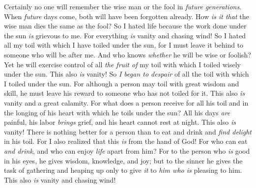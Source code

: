\begin{biblechapter}
\verse Certainly no one will remember the wise man or the fool in \textit{future generations}. When \textit{future} days come, both will have been forgotten already. How \textit{is it that} the wise man dies the same as the fool?
\verse So I hated life because the work done under the sun \textit{is} grievous to me. For everything \textit{is} vanity and chasing wind!
\verse So I hated all my toil with which I have toiled under the sun, for I must leave it behind to someone who will be after me.
\verse And who knows \textit{whether} he will be wise or foolish? Yet he will exercise control of all \textit{the fruit of} my toil with which I toiled wisely under the sun. This also \textit{is} vanity!
\verse So \textit{I began to despair} of all the toil with which I toiled under the sun.
\verse For although a person may toil with great wisdom and skill, he must leave his reward to someone who has not toiled for it. This also \textit{is} vanity and a great calamity.
\verse For what does a person receive for all his toil and in the longing of his heart with which he toils under the sun?
\verse All his days \textit{are} painful, his labor \textit{brings} grief, and his heart cannot rest at night. This also \textit{is} vanity!
 There is nothing better for a person than to eat and drink and \textit{find delight} in his toil. For I also realized that this \textit{is} from the hand of God!
\verse For who can eat \textit{and drink}, and who can enjoy \textit{life} apart from him?
\verse For to the person who \textit{is} good in his eyes, he gives wisdom, knowledge, and joy; but to the sinner he gives the task of gathering and heaping up only to give \textit{it} to \textit{him who is} pleasing to him. This also \textit{is} vanity and chasing wind!
\end{biblechapter}

